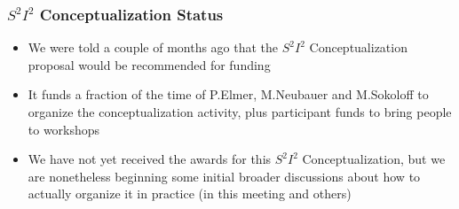 \begin{frame}
\frametitle{$ S^2 I^2 $ Conceptualization Status}

\begin{itemize}
\item We were told a couple of months ago that the $ S^2 I^2 $ Conceptualization proposal would be recommended for funding
\item It funds a fraction of the time of P.Elmer, M.Neubauer and M.Sokoloff to organize the conceptualization activity, plus participant funds to bring people to workshops
\item We have not yet received the awards for this $ S^2 I^2 $ Conceptualization, but we are nonetheless beginning some initial broader discussions about how to actually organize it in practice (in this meeting and others)
\end{itemize}

\end{frame}


